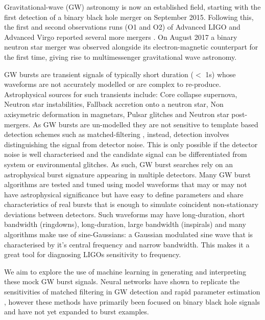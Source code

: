 \documentclass[12pt]{iopart}
\begin{document}
Gravitational-wave (GW) astronomy is now an established field, starting with the first detection of a binary black hole merger \cite{Abbott2016} on September 2015. Following this, the first and second observations runs (O1 and O2) of Advanced LIGO and Advanced Virgo reported several more mergers \cite{Abbott2016a, Abbott2017, Abbott2017a, Abbott2017b}. On August 2017 a binary neutron star merger was observed alongside its electron-magnetic counterpart for the first time, giving rise to multimessenger gravitational wave astronomy. 

GW bursts are transient signals of typically short duration ($<$ 1s) whose waveforms are not accurately modelled or are complex to re-produce. Astrophysical sources for such transients include: Core collapse supernova, Neutron star instabilities, Fallback accretion onto a neutron star, Non axisymetric deformation in magnetars, Pulsar glitches and Neutron star post-mergers.
As GW bursts are un-modelled they are not sensitive to template based detection schemes such as matched-filtering \cite{Owen1998}, instead, detection involves distinguishing the signal from detector noise. This is only possible if the detector noise is well characterised and the candidate signal can be differentiated from system or environmental glitches. As such, GW burst searches rely on an astrophysical burst signature appearing in multiple detectors.
Many GW burst algorithms \cite{Klimenko_2008, Aso_2008} are tested and tuned using model waveforms that may or may not have astrophysical significance but have easy to define parameters and share characteristics of real bursts that is enough to simulate coincident non-stationary deviations between detectors. Such waveforms may have long-duration, short bandwidth (ringdowns), long-duration, large bandwidth (inspirals) and many algorithms make use of sine-Gaussians: a Gaussian modulated sine wave that is characterised by it's central frequency and narrow bandwidth. This makes it a great tool for diagnosing LIGOs sensitivity to frequency. 

We aim to explore the use of machine learning in generating and interpreting these mock GW burst signals. Neural networks have shown to replicate the sensitivities of matched filtering in GW detection \cite{Gabbard2017} and rapid parameter estimation \cite{gabbard2019bayesian}, however these methods have primarily been focused on binary black hole signals and have not yet expanded to burst examples. 

\end{document}

